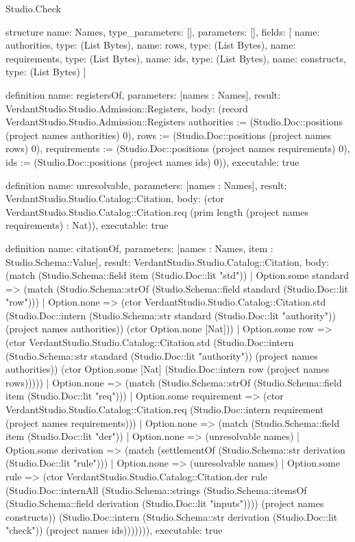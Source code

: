 \begin{lexlean}{Studio.Check}
\begin{semanticmodule}
structure{
  name: Names,
  type_parameters: [],
  parameters: [],
  fields: [
    {name: authorities, type: (List Bytes)},
    {name: rows, type: (List Bytes)},
    {name: requirements, type: (List Bytes)},
    {name: ids, type: (List Bytes)},
    {name: constructs, type: (List Bytes)}
  ]
}

definition{
  name: registersOf,
  parameters: [names : Names],
  result: VerdantStudio.Studio.Admission::Registers,
  body: (record VerdantStudio.Studio.Admission::Registers {authorities := (Studio.Doc::positions (project names authorities) 0), rows := (Studio.Doc::positions (project names rows) 0), requirements := (Studio.Doc::positions (project names requirements) 0), ids := (Studio.Doc::positions (project names ids) 0)}),
  executable: true
}

definition{
  name: unresolvable,
  parameters: [names : Names],
  result: VerdantStudio.Studio.Catalog::Citation,
  body: (ctor VerdantStudio.Studio.Catalog::Citation.req (prim length (project names requirements) : Nat)),
  executable: true
}

definition{
  name: citationOf,
  parameters: [names : Names, item : Studio.Schema::Value],
  result: VerdantStudio.Studio.Catalog::Citation,
  body: (match (Studio.Schema::field item (Studio.Doc::lit "std"))
    | Option.some standard => (match (Studio.Schema::strOf (Studio.Schema::field standard (Studio.Doc::lit "row")))
      | Option.none => (ctor VerdantStudio.Studio.Catalog::Citation.std (Studio.Doc::intern (Studio.Schema::str standard (Studio.Doc::lit "authority")) (project names authorities)) (ctor Option.none [Nat]))
      | Option.some row => (ctor VerdantStudio.Studio.Catalog::Citation.std (Studio.Doc::intern (Studio.Schema::str standard (Studio.Doc::lit "authority")) (project names authorities)) (ctor Option.some [Nat] (Studio.Doc::intern row (project names rows)))))
    | Option.none => (match (Studio.Schema::strOf (Studio.Schema::field item (Studio.Doc::lit "req")))
      | Option.some requirement => (ctor VerdantStudio.Studio.Catalog::Citation.req (Studio.Doc::intern requirement (project names requirements)))
      | Option.none => (match (Studio.Schema::field item (Studio.Doc::lit "der"))
        | Option.none => (unresolvable names)
        | Option.some derivation => (match (settlementOf (Studio.Schema::str derivation (Studio.Doc::lit "rule")))
          | Option.none => (unresolvable names)
          | Option.some rule => (ctor VerdantStudio.Studio.Catalog::Citation.der rule (Studio.Doc::internAll (Studio.Schema::strings (Studio.Schema::itemsOf (Studio.Schema::field derivation (Studio.Doc::lit "inputs")))) (project names constructs)) (Studio.Doc::intern (Studio.Schema::str derivation (Studio.Doc::lit "check")) (project names ids))))))),
  executable: true
}


\end{semanticmodule}
\end{lexlean}
